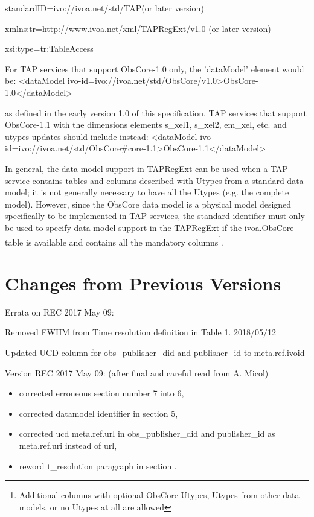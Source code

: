 \documentclass[11pt,a4paper]{ivoa}
\begin{document}
standardID={\textquotedbl}ivo://ivoa.net/std/TAP{\textquotedbl}(or later version)

xmlns:tr={\textquotedbl}http://www.ivoa.net/xml/TAPRegExt/v1.0{\textquotedbl} (or later version) 

xsi:type={\textquotedbl}tr:TableAccess{\textquotedbl}

For TAP services that support ObsCore-1.0 only, the {}'dataModel' element would be:   {\textless}dataModel
ivo-id={\textquotedbl}ivo://ivoa.net/std/ObsCore/v1.0{\textquotedbl}{\textgreater}ObsCore-1.0{\textless}/dataModel{\textgreater}


as defined in the early version 1.0 of this specification.  TAP services that support ObsCore-1.1 with the dimensions
elements s\_xel1, s\_xel2, em\_xel, etc. and utypes updates should include instead:  {\textless}dataModel
ivo-id={\textquotedbl}ivo://ivoa.net/std/ObsCore\#core-1.1{\textquotedbl}{\textgreater}ObsCore-1.1{\textless}/dataModel{\textgreater}


In general, the data model support in TAPRegExt can be used when a TAP service contains tables and columns described
with Utypes from a standard data model; it is not generally necessary to have all the Utypes (e.g. the complete model).
However, since the ObsCore data model is a physical model designed specifically to be implemented in TAP services, the
standard identifier must only be used to specify data model support in the TAPRegExt if the ivoa.ObsCore table is
available and contains all the mandatory columns\footnote{ Additional columns with optional ObsCore Utypes, Utypes from
other data models, or no Utypes at all are allowed}.

\section{Changes from Previous Versions}
Errata on REC 2017 May 09:

Removed FWHM from Time resolution definition in Table 1. 2018/05/12

Updated UCD column for obs\_publisher\_did and publisher\_id to meta.ref.ivoid

Version REC 2017 May 09: (after final and careful read from A. Micol)

\begin{itemize}
\item corrected erroneous section number 7 into 6, 
\item corrected  datamodel identifier in section 5,
\item corrected ucd meta.ref.url in obs\_publisher\_did and publisher\_id  as meta.ref.uri instead of url,
\item reword t\_resolution paragraph in section .
\end{itemize}
\end{document}
